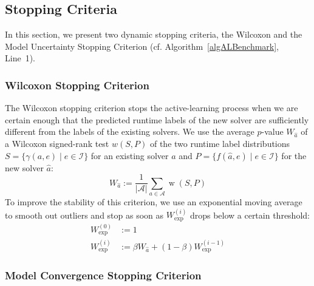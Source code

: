 \documentclass[runningheads]{llncs}
\begin{document}
\subsection{Stopping Criteria}
\label{sec:main-stopping}


In this section, we present two dynamic stopping criteria, the Wilcoxon and the Model Uncertainty Stopping Criterion (cf. Algorithm~\ref{algALBenchmark}, Line~1).

\subsubsection{Wilcoxon Stopping Criterion}

The Wilcoxon stopping criterion stops the active-learning process when we are certain enough that the predicted runtime labels of the new solver are sufficiently different from the labels of the existing solvers.
We use the average $p$-value $W_{\hat{a}}$ of a Wilcoxon signed-rank test $w(S,P)$ of the two runtime label distributions $S=\{ \gamma(a, e) \mid e \in \mathcal{I} \}$ for an existing solver $a$ and $P=\{ f(\hat a, e) \mid e \in \mathcal{I} \}$ for the new solver $\hat{a}$:
%
\begin{equation*}
  W_{\hat{a}} := \frac{1}{\lvert \mathcal{A} \rvert} \sum_{a \in \mathcal{A}} \operatorname{w}(S, P)
\end{equation*}
%
To improve the stability of this criterion, we use an exponential moving average to smooth out outliers and stop as soon as $W^{(i)}_{\exp}$ drops below a certain threshold:
%
\begin{align*}
	W_{\exp}^{\left(0\right)} &:= 1\\
	W_{\exp}^{\left(i\right)} &:= \beta W_{\hat{a}} + \left(1 - \beta\right) W_{\exp}^{\left(i - 1\right)}
\end{align*}

\subsubsection{Model Convergence Stopping Criterion}
\end{document}
